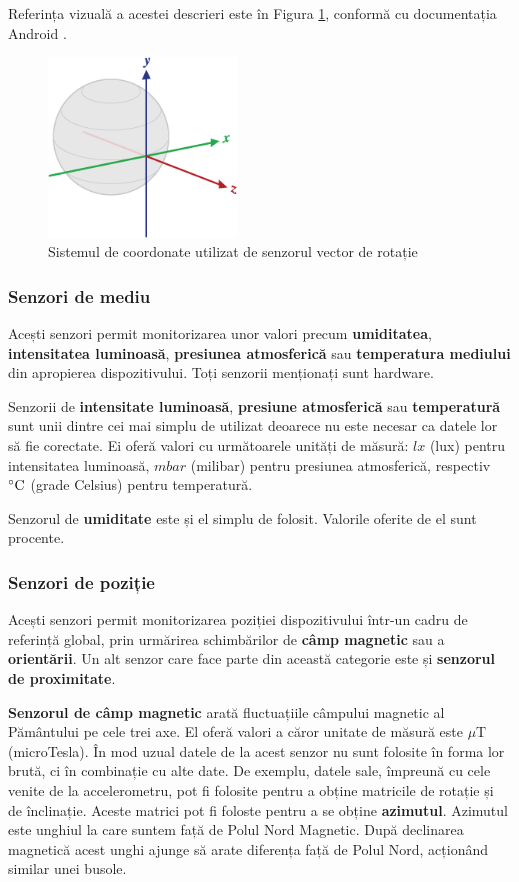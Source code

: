 \documentclass[12pt, a4paper, oneside]{article}
\begin{document}
	Referința vizuală a acestei descrieri este în Figura \ref{fig:axis_globe}, conformă cu documentația Android \cite{DeveloperAndroid}.

\begin{figure}[h]
\centering
\includegraphics[width=5cm]{figures/axis_globe.png}
\caption{Sistemul de coordonate utilizat de senzorul vector de rotație}
\label{fig:axis_globe}
\end{figure}

\subsubsection{Senzori de mediu}
Acești senzori permit monitorizarea unor valori precum \textbf{umiditatea}, \textbf{intensitatea luminoasă}, \textbf{presiunea atmosferică} sau \textbf{temperatura mediului} din apropierea dispozitivului. Toți senzorii menționați sunt hardware.

Senzorii de \textbf{intensitate luminoasă}, \textbf{presiune atmosferică} sau \textbf{temperatură} sunt unii dintre cei mai simplu de utilizat deoarece nu este necesar ca datele lor să fie corectate. Ei oferă valori cu următoarele unități de măsură: $lx$ (lux) pentru intensitatea luminoasă, $mbar$ (milibar) pentru presiunea atmosferică, respectiv $\celsius$ (grade Celsius) pentru temperatură.

Senzorul de \textbf{umiditate} este și el simplu de folosit. Valorile oferite de el sunt procente.


\subsubsection{Senzori de poziție}
Acești senzori permit monitorizarea poziției dispozitivului într-un cadru de referință global, prin urmărirea schimbărilor de \textbf{câmp magnetic} sau a \textbf{orientării}. Un alt senzor care face parte din această categorie este și  \textbf{senzorul de proximitate}.

\textbf{Senzorul de câmp magnetic} arată fluctuațiile câmpului magnetic al Pământului pe cele trei axe. El oferă valori a căror unitate de măsură este $\mu$T (microTesla). În mod uzual datele de la acest senzor nu sunt folosite în forma lor brută, ci în combinație cu alte date. De exemplu, datele sale, împreună cu cele venite de la accelerometru, pot fi folosite pentru a obține matricile de rotație și de înclinație. Aceste matrici pot fi foloste pentru a se obține \textbf{azimutul}. Azimutul este unghiul la care suntem față de Polul Nord Magnetic. După declinarea magnetică acest unghi ajunge să arate diferența față de Polul Nord, acționând similar unei busole.
\end{document}
